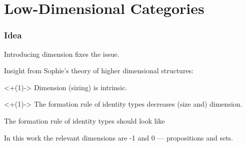 \section{Low-Dimensional Categories}

\begin{frame}
  \frametitle{Idea}

  \pause Introducing dimension fixes the issue.

  \pause Insight from Sophie's theory of higher dimensional structures:
  \begin{tightitemize}
    \item<+(1)-> Dimension (sizing) is intrinsic.
    \item<+(1)-> The formation rule of identity types decreases (size and)
      dimension.
  \end{tightitemize}

  \pause The formation rule of identity types should look like
  \begin{tightcenter}
    \begin{prooftree}
    \end{prooftree}
  \end{tightcenter}

  \pause In this work the relevant dimensions are -1 and 0 --- propositions and
  sets.
\end{frame}

\newcommand{\dimdeclentry}[2]{
    \AgdDta{#1}\AgdaSpace{}
  & \AgdaSymbol{:}\AgdaSpace{}
  & #2
}

